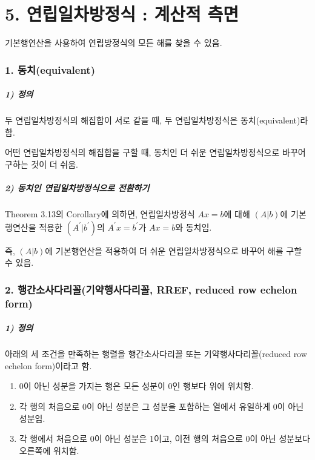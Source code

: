 \part*{5. 연립일차방정식 : 계산적 측면}

기본행연산을 사용하여 연립방정식의 모든 해를 찾을 수 있음.

\section*{1. 동치(equivalent)}
\subsubsection*{1) 정의\\}
\begin{DEF}
두 연립일차방정식의 해집합이 서로 같을 때, 두 연립일차방정식은 동치(equivalent)라 함.
\end{DEF}

어떤 연립일차방정식의 해집합을 구할 때, 동치인 더 쉬운 연립일차방정식으로 바꾸어 구하는 것이 더 쉬움.

\subsubsection*{2) 동치인 연립일차방정식으로 전환하기}
Theorem 3.13의 Corollary에 의하면, 연립일차방정식 $Ax=b$에 대해 $(A|b)$에 기본행연산을 적용한 $(A^{\prime}|b^{\prime})$의 $A^{\prime}x=b^{\prime}$가 $Ax=b$와 동치임.

즉, $(A|b)$에 기본행연산을 적용하여 더 쉬운 연립일차방정식으로 바꾸어 해를 구할 수 있음.

\section*{2. 행간소사다리꼴(기약행사다리꼴, RREF, reduced row echelon form)}
\subsubsection*{1) 정의\\}
\begin{DEF}
아래의 세 조건을 만족하는 행렬을 행간소사다리꼴 또는 기약행사다리꼴(reduced row echelon form)이라고 함.

\begin{enumerate}
    \item 0이 아닌 성분을 가지는 행은 모든 성분이 0인 행보다 위에 위치함.
    \item 각 행의 처음으로 0이 아닌 성분은 그 성분을 포함하는 열에서 유일하게 0이 아닌 성분임.
    \item 각 행에서 처음으로 0이 아닌 성분은 1이고, 이전 행의 처음으로 0이 아닌 성분보다 오른쪽에 위치함.
\end{enumerate}
\end{DEF}

